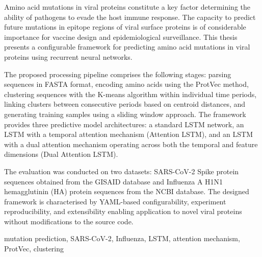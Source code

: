 \newpage %

\abstract

Amino acid mutations in viral proteins constitute a key factor determining the ability of pathogens to evade the host immune response. The capacity to predict future mutations in epitope regions of viral surface proteins is of considerable importance for vaccine design and epidemiological surveillance. This thesis presents a configurable framework for predicting amino acid mutations in viral proteins using recurrent neural networks.

The proposed processing pipeline comprises the following stages: parsing sequences in FASTA format, encoding amino acids using the ProtVec method, clustering sequences with the K-means algorithm within individual time periods, linking clusters between consecutive periods based on centroid distances, and generating training samples using a sliding window approach. The framework provides three predictive model architectures: a standard LSTM network, an LSTM with a temporal attention mechanism (Attention LSTM), and an LSTM with a dual attention mechanism operating across both the temporal and feature dimensions (Dual Attention LSTM).

The evaluation was conducted on two datasets: SARS-CoV-2 Spike protein sequences obtained from the GISAID database and Influenza A H1N1 hemagglutinin (HA) protein sequences from the NCBI database.
The designed framework is characterised by YAML-based configurability, experiment reproducibility, and extensibility enabling application to novel viral proteins without modifications to the source code.

\keywords mutation prediction, SARS-CoV-2, Influenza, LSTM, attention mechanism, ProtVec, clustering

